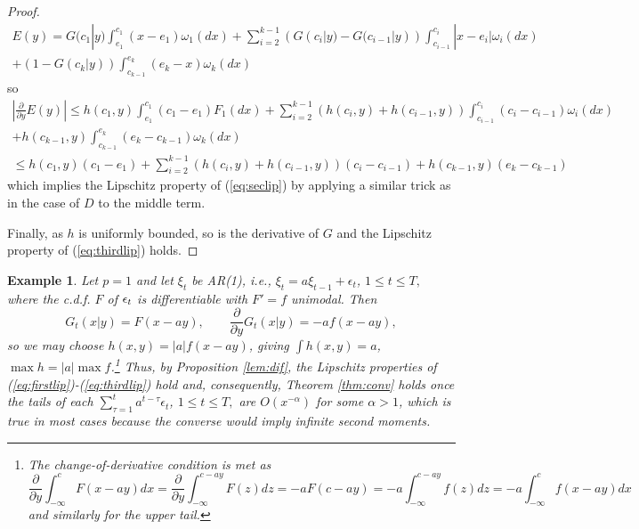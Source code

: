 \documentclass{article}              %
\newtheorem{example}{Example}
\begin{document}
\begin{proof}
\begin{multline*}
E(y)=G(c_{1}|y)\int_{e_{1}}^{c_{1}}(x-e_{1})\omega_{1}(dx)
+\sum_{i=2}^{k-1}(G(c_{i}|y)-G(c_{i-1}|y))\int_{c_{i-1}}^{c_{i}}|x-e_{i}|\omega_{i}(dx)\\
+(1-G(c_{k}|y))\int_{c_{k-1}}^{e_{k}}(e_{k}-x)\omega_{k}(dx)
\end{multline*}
so 
\begin{multline*}
\left|\frac{\partial}{\partial y}E(y)\right|
\leq h(c_{1},y)\int_{e_{1}}^{c_{1}}(c_{1}-e_{1})F_{1}(dx)+\sum_{i=2}^{k-1}(h(c_{i},y)+h(c_{i-1},y))\int_{c_{i-1}}^{c_{i}}(c_{i}-c_{i-1})\omega_{i}(dx)\\
+h(c_{k-1},y)\int_{c_{k-1}}^{e_{k}}(e_{k}-c_{k-1})\omega_{k}(dx)\\
\leq h(c_{1},y)(c_{1}-e_{1})+\sum_{i=2}^{k-1}(h(c_{i},y)+h(c_{i-1},y))(c{}_{i}-c_{i-1})+h(c_{k-1},y)(e_{k}-c_{k-1})
\end{multline*}
which implies the Lipschitz property of  (\ref{eq:seclip}) by applying a similar trick as in the
case of $D$ to the middle term. 

Finally, as $h$ is uniformly bounded, so is the derivative of $G$
and the Lipschitz property of (\ref{eq:thirdlip}) holds.
\end{proof}

\begin{example}
Let $p=1$ and let $\xi_{t}$ be AR(1), i.e., $\xi_{t}=a\xi_{t-1}+\epsilon_{t}$,
$1\leq t\leq T,$ where the c.d.f. $F$ of $\text{\ensuremath{\epsilon_{t}}}$
is differentiable with $F'=f$ unimodal. Then 
\[
G_{t}(x|y)=F(x-ay),\qquad\frac{\partial}{\partial y}G_{t}(x|y)=-af(x-ay),
\]
so we may choose $h(x,y)=|a|f(x-ay)$, giving $\int h(x,y)=a$, $\max h=|a|\max f$.\footnote{The change-of-derivative condition is met as 
$$
\frac{\partial}{\partial y}\int_{-\infty}^{c}F(x-ay)dx=\frac{\partial}{\partial y}\int_{-\infty}^{c-ay}F(z)dz
=-aF(c-ay)=-a\int_{-\infty}^{c-ay}f(z)dz=-a\int_{-\infty}^{c}f(x-ay)dx
$$
and similarly for the upper tail.} Thus, by Proposition \ref{lem:dif}, the Lipschitz properties of (\ref{eq:firstlip})-(\ref{eq:thirdlip})
hold and, consequently, Theorem \ref{thm:conv} holds once the tails
of each $\sum_{\tau=1}^{t}a^{t-\tau}\epsilon_{t}$, $1\leq t\leq T,$
are \emph{$O(x^{-\alpha})$ }for some \emph{$\alpha>1$}, which is
true in most cases because the converse would imply infinite second
moments. 
\end{example}
\end{document}
